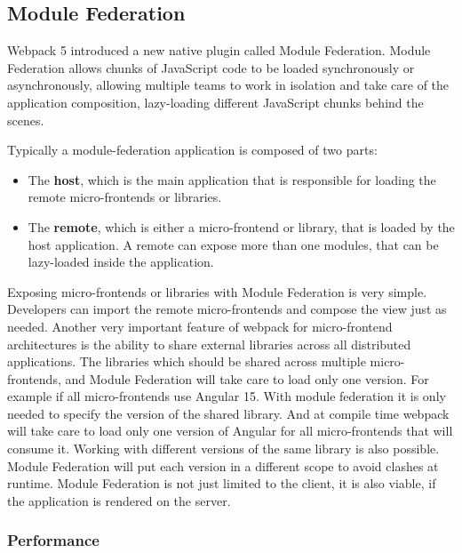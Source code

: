 \subsection{Module Federation}

Webpack 5 introduced a new native plugin called Module Federation. Module Federation allows chunks of JavaScript code to be loaded synchronously or asynchronously, allowing multiple teams to work in isolation and take care of the application composition, lazy-loading different JavaScript chunks behind the scenes. \cite[81]{book:2021:mezzalira:applied-methods:building-micro-frontends}

\bigskip

\noindent Typically a module-federation application is composed of two parts: \cite[81]{book:2021:mezzalira:applied-methods:building-micro-frontends}

\begin{itemize}
  \item The \textbf{host}, which is the main application that is responsible for loading the remote micro-frontends or libraries.
  \item The \textbf{remote}, which is either a micro-frontend or library, that is loaded by the host application. A remote can expose more than one modules, that can be lazy-loaded inside the application.
\end{itemize}

\noindent Exposing micro-frontends or libraries with Module Federation is very simple. Developers can import the remote micro-frontends and compose the view just as needed. Another very important feature of webpack for micro-frontend architectures is the ability to share external libraries across all distributed applications. The libraries which should be shared across multiple micro-frontends, and Module Federation will take care to load only one version. For example if all micro-frontends use Angular 15. With module federation it is only needed to specify the version of the shared library. And at compile time webpack will take care to load only one version of Angular for all micro-frontends that will consume it. Working with different versions of the same library is also possible. Module Federation will put each version in a different scope to avoid clashes at runtime. Module Federation is not just limited to the client, it is also viable, if the application is rendered on the server. \cite[82-83]{book:2021:mezzalira:applied-methods:building-micro-frontends}

\subsubsection{Performance}

